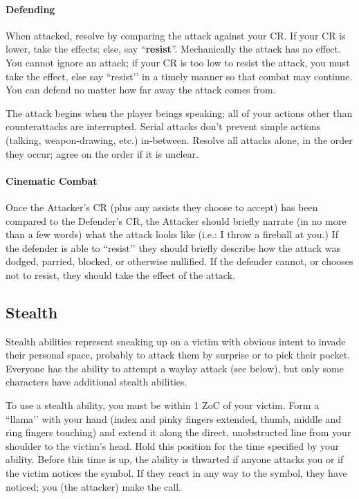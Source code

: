 \documentclass[sheet]{GL2020}
\begin{document}
\paragraph{Defending} When attacked, resolve by comparing the attack against your CR.  If your CR is lower, take the effects; else, say ``{\bf resist}''. Mechanically the attack has no effect. You cannot ignore an attack; if your CR is too low to resist the attack, you must take the effect, else say ``resist’’ in a timely manner so that combat may continue. You can defend no matter how far away the attack comes from.

The attack begins when the player beings speaking; all of your actions other than counterattacks are interrupted. Serial attacks don't prevent simple actions (talking, weapon-drawing, etc.) in-between. Resolve all attacks alone, in the order they occur; agree on the order if it is unclear.

\paragraph{Cinematic Combat} Once the Attacker’s CR (plus any assists they choose to accept) has been compared to the Defender’s CR, the Attacker should briefly narrate (in no more than a few words) what the attack looks like (i.e.: I throw a fireball at you.) If the defender is able to ``resist’’ they should briefly describe how the attack was dodged, parried, blocked, or otherwise nullified. If the defender cannot, or chooses not to resist, they should take the effect of the attack.

\subsection{Stealth}

Stealth abilities represent sneaking up on a victim with obvious intent to invade their personal space, probably to attack them by surprise or to pick their pocket. Everyone has the ability to attempt a waylay attack (see below), but only some characters have additional stealth abilities.

To use a stealth ability, you must be within 1 ZoC of your victim. Form a ``llama’’ with your hand (index and pinky fingers extended, thumb, middle and ring fingers touching) and extend it along the direct, unobstructed line from your shoulder to the victim's head. Hold this position for the time specified by your ability. Before this time is up, the ability is thwarted if anyone attacks you or if the victim notices the symbol. If they react in any way to the symbol, they have noticed; you (the attacker) make the call.
\end{document}
